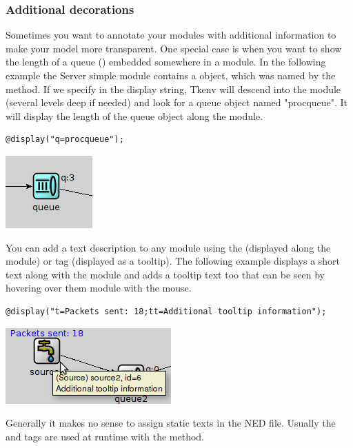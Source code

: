 \subsubsection{Additional decorations}
Sometimes you want to annotate your modules with additional information
to make your model more transparent. One special case is when you want to
show the length of a queue () embedded somewhere in a module.
In the following example the Server simple module contains a  object,
which was named by the  method. 
If we specify  in the display string, Tkenv will descend into 
the module (several levels deep if needed) and look for a queue object
named "procqueue". It will display the length of the queue object along the module.
\begin{verbatim}
@display("q=procqueue");
\end{verbatim}

\begin{center}
\includegraphics{figures/graphics-qtag}
\end{center}

You can add a text description to any module using the 
(displayed along the module) or  tag (displayed as a tooltip).
The following example displays a short text along with the module
and adds a tooltip text too that can be seen by hovering over
them module with the mouse.

\begin{verbatim}
@display("t=Packets sent: 18;tt=Additional tooltip information");
\end{verbatim}

\begin{center}
\includegraphics{figures/graphics-ttag}
\end{center}

\begin{note}
  Generally it makes no sense to assign static texts in the NED file. Usually the 
   and  tags are used at runtime with the 
  method. 
\end{note}

